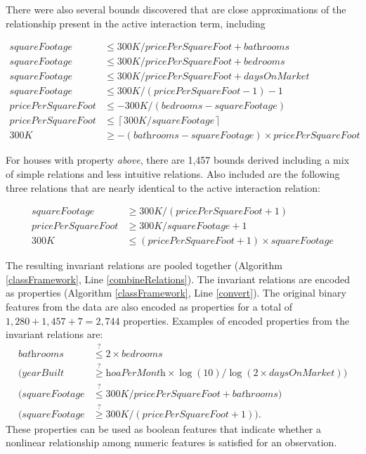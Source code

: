 \documentclass[ijds,nonblindrev]{informs-ijds}
\begin{document}
There were also several bounds discovered that are close approximations of the relationship present in the active interaction term, including

\begin{align}
\textit{squareFootage} & \leq  \textit {300K}/\textit {pricePerSquareFoot} + \textit {bathrooms}\\
\textit{squareFootage} & \leq  \textit {300K}/\textit {pricePerSquareFoot} + \textit {bedrooms}\\
\textit{squareFootage} & \leq  \textit {300K}/\textit {pricePerSquareFoot} + \textit {daysOnMarket}\\
\textit{squareFootage} & \leq  \textit {300K}/(\textit {pricePerSquareFoot} -1) - 1\\
\textit{pricePerSquareFoot} & \leq  -\textit {300K}/(\textit {bedrooms} -\textit {squareFootage})\\
\textit{pricePerSquareFoot} & \leq  \left\lceil \textit {300K}/\textit {squareFootage} \right\rceil\\
\textit{300K} & \geq  -(\textit {bathrooms} - \textit {squareFootage}) \times \textit {pricePerSquareFoot}
\end{align}

For houses with property {\it above}, there are 1,457 bounds derived including a mix of simple relations and less intuitive relations.  Also included are the following three relations that are nearly identical to the active interaction relation:

\begin{align}
\textit{squareFootage} & \geq  \textit{300K}/(\textit{pricePerSquareFoot}+1)\\
\textit{pricePerSquareFoot} & \geq  \textit{300K}/\textit{squareFootage} + 1\\
\textit{300K} & \leq  (\textit{pricePerSquareFoot} + 1) \times \textit{squareFootage}
\end{align}

The resulting invariant relations are pooled together (Algorithm \ref{classFramework}, Line \ref{combineRelations}).  The invariant relations are encoded as properties (Algorithm \ref{classFramework}, Line \ref{convert}).
The original binary features from the data are also encoded as properties  for a total of $1,280 + 1,457 + 7= 2,744$ properties. Examples of encoded properties from the invariant relations are:
\begin{align}
\textit{bathrooms} & \stackrel{?}{\leq}  2 \times \textit{bedrooms} \\
(\textit{yearBuilt} & \stackrel{?}{\geq}  \textit{hoaPerMonth} \times \log(10) / \log (2\times\textit{daysOnMarket})) \\
(\textit{squareFootage} & \stackrel{?}{\leq}  \textit {300K}/\textit {pricePerSquareFoot} + \textit {bathrooms}) \\
(\textit{squareFootage} & \stackrel{?}{\geq}  \textit{300K}/(\textit{pricePerSquareFoot}+1)). 
\end{align}
These properties can be used as boolean features that indicate whether a nonlinear relationship among numeric features is satisfied for an observation.
\end{document}

